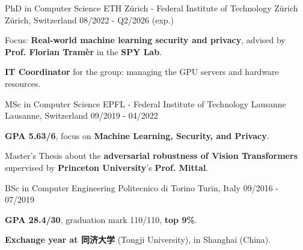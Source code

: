 

\begin{cventries}
  \cventry
  {PhD in Computer Science} %
  {ETH Z{\"u}rich - Federal Institute of Technology Z{\"u}rich} %
  {Z{\"u}rich, Switzerland} %
  {08/2022 - Q2/2026 (exp.)} %
  {
    \begin{cvitems} %
      \item Focus: \textbf{Real-world machine learning security and privacy}, advised by \textbf{Prof. Florian Tram{\`e}r} in the \textbf{SPY Lab}.
      \item \textbf{IT Coordinator} for the group: managing the GPU servers and hardware resources.
    \end{cvitems}
  }
  
  \cventry
  {MSc in Computer Science} %
  {EPFL - Federal Institute of Technology Lausanne} %
  {Lausanne, Switzerland} %
  {09/2019 - 04/2022} %
  {
    \begin{cvitems} %
      \item \textbf{GPA 5.63/6}, focus on \textbf{Machine Learning, Security, and Privacy}.
      \item Master's Thesis about the \textbf{adversarial robustness of Vision Transformers} supervised by \textbf{Princeton University}'s \textbf{Prof. Mittal}.
    \end{cvitems}
  }
  
  \cventry
  {BSc in Computer Engineering} %
  {Politecnico di Torino} %
  {Turin, Italy} %
  {09/2016 - 07/2019} %
  {
    \begin{cvitems} %
      \item \textbf{GPA 28.4/30}, graduation mark 110/110, \textbf{top 9\%}.
      \item \textbf{Exchange year at 同济大学} (Tongji University), in Shanghai (China).
    \end{cvitems}
  }

\end{cventries}
